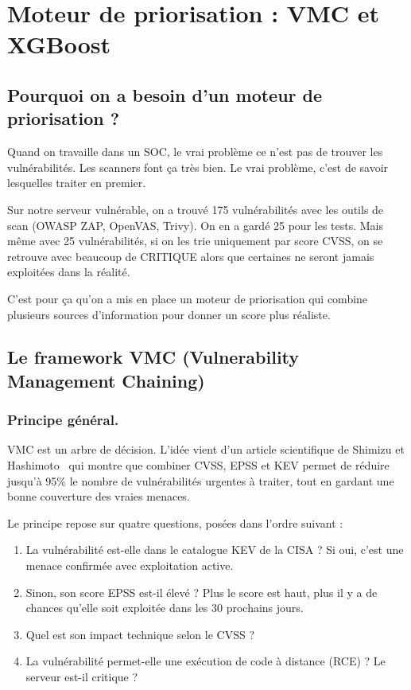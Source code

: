 \documentclass[runningheads]{llncs}
\begin{document}

\section{Moteur de priorisation : VMC et XGBoost}

\subsection{Pourquoi on a besoin d'un moteur de priorisation ?}

Quand on travaille dans un SOC, le vrai problème ce n'est pas de trouver les vulnérabilités. Les scanners font ça très bien. Le vrai problème, c'est de savoir lesquelles traiter en premier.

Sur notre serveur vulnérable, on a trouvé 175 vulnérabilités avec les outils de scan (OWASP ZAP, OpenVAS, Trivy). On en a gardé 25 pour les tests. Mais même avec 25 vulnérabilités, si on les trie uniquement par score CVSS, on se retrouve avec beaucoup de \og CRITIQUE \fg{} alors que certaines ne seront jamais exploitées dans la réalité.

C'est pour ça qu'on a mis en place un moteur de priorisation qui combine plusieurs sources d'information pour donner un score plus réaliste.

\subsection{Le framework VMC (Vulnerability Management Chaining)}

\subsubsection{Principe général.}

VMC est un arbre de décision. L'idée vient d'un article scientifique de Shimizu et Hashimoto~\cite{shimizu2023vmc} qui montre que combiner CVSS, EPSS et KEV permet de réduire jusqu'à 95\% le nombre de vulnérabilités \og urgentes \fg{} à traiter, tout en gardant une bonne couverture des vraies menaces.

Le principe repose sur quatre questions, posées dans l'ordre suivant :
\begin{enumerate}
    \item La vulnérabilité est-elle dans le catalogue KEV de la CISA ? Si oui, c'est une menace confirmée avec exploitation active.
    \item Sinon, son score EPSS est-il élevé ? Plus le score est haut, plus il y a de chances qu'elle soit exploitée dans les 30 prochains jours.
    \item Quel est son impact technique selon le CVSS ?
    \item La vulnérabilité permet-elle une exécution de code à distance (RCE) ? Le serveur est-il critique ?
\end{enumerate}
\end{document}
